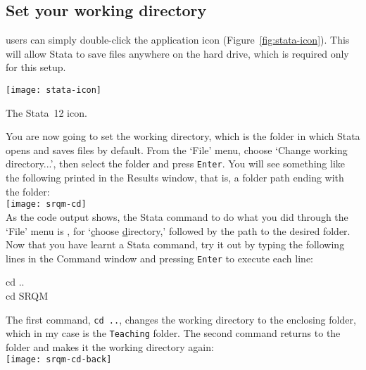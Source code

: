 	\subsection{Set your working directory}%
		\label{sec:working-directory}%

   \OSX users can simply double-click the application icon (Figure~\ref{fig:stata-icon}).  This will allow Stata to save files anywhere on the hard drive, which is required only for this setup.%

		\begin{marginfigure}
			\texttt{[image: stata-icon]}
			\caption{The Stata~12 icon.}
			\label{fig:stata-icon}
	  \end{marginfigure}
	 
	You are now going to set the working directory, which is the folder in which Stata opens and saves files by default. From the `File' menu, choose `Change working directory...', then select the \SRQM folder and press \texttt{Enter}. You will see something like the following printed in the Results window, that is, a folder path ending with the \SRQM folder:\\[1em]%
	
		\texttt{[image: srqm-cd]}\\[1em]

	As the code output shows, the Stata command to do what you did through the `File' menu is , for `\underline{c}hoose \underline{d}irectory,' followed by the path to the desired folder. Now that you have learnt a Stata command, try it out by typing the following lines in the Command window and pressing \texttt{Enter} to execute each line:%
	
	\begin{docspec}
		cd ..\\
		cd SRQM
	\end{docspec}
	
	The first command, \texttt{cd ..}, changes the working directory to the enclosing folder, which in my case is the \texttt{Teaching} folder. The second command returns to the \SRQM folder and makes it the working directory again:\\[1em]%
		
	\texttt{[image: srqm-cd-back]}\\[1em]
	
